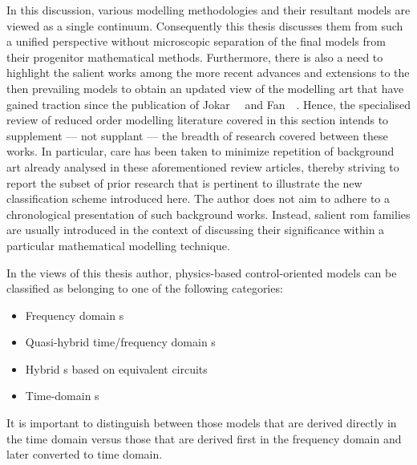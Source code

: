 In this discussion,  various modelling methodologies and  their resultant models
are viewed as  a single continuum. Consequently this thesis  discusses them from
such a  unified perspective without  microscopic separation of the  final models
from their progenitor mathematical methods. Furthermore, there is also a need to
highlight the salient works among the more recent advances and extensions to the
then  prevailing models  to obtain  an updated  view of  the modelling  art that
have  gained  traction  since the  publication  of  Jokar~\etal~\cite{Jokar2016}
and  Fan~\etal~\cite{Fan2015}. Hence,  the specialised  review of  reduced order
modelling  literature covered  in this  section  intends to  supplement ---  not
supplant --- the breadth of research covered between these works. In particular,
care has been taken to minimize repetition of background art already analysed in
these aforementioned review  articles, thereby striving to report  the subset of
prior research  that is  pertinent to illustrate  the new  classification scheme
introduced  here.  The  author  does  not  aim  to  adhere  to  a  chronological
presentation of such  background works. Instead, salient  \gls{rom} families are
usually  introduced in  the context  of discussing  their significance  within a
particular mathematical modelling technique.


In the views of this thesis author, physics-based control-oriented models can be
classified as belonging to one of the following categories:
\begin{itemize}
    \item Frequency domain s
    \item Quasi-hybrid time/frequency domain s
    \item Hybrid s based on equivalent circuits
    \item Time-domain s
\end{itemize}
It is important to distinguish between those models that are derived directly in
the time  domain versus  those that  are derived first  in the  frequency domain
and  later  converted  to  time  domain.  


